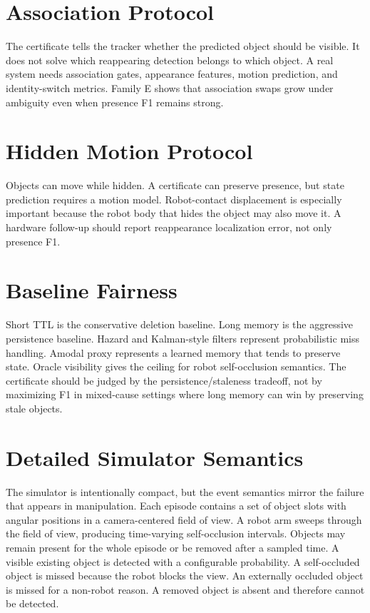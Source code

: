 \documentclass{article}
\begin{document}
\section{Association Protocol}

The certificate tells the tracker whether the predicted object should be
visible. It does not solve which reappearing detection belongs to which object.
A real system needs association gates, appearance features, motion prediction,
and identity-switch metrics. Family E shows that association swaps grow under
ambiguity even when presence F1 remains strong.

\section{Hidden Motion Protocol}

Objects can move while hidden. A certificate can preserve presence, but state
prediction requires a motion model. Robot-contact displacement is especially
important because the robot body that hides the object may also move it. A
hardware follow-up should report reappearance localization error, not only
presence F1.

\section{Baseline Fairness}

Short TTL is the conservative deletion baseline. Long memory is the aggressive
persistence baseline. Hazard and Kalman-style filters represent probabilistic
miss handling. Amodal proxy represents a learned memory that tends to preserve
state. Oracle visibility gives the ceiling for robot self-occlusion semantics.
The certificate should be judged by the persistence/staleness tradeoff, not by
maximizing F1 in mixed-cause settings where long memory can win by preserving
stale objects.

\section{Detailed Simulator Semantics}

The simulator is intentionally compact, but the event semantics mirror the
failure that appears in manipulation. Each episode contains a set of object
slots with angular positions in a camera-centered field of view. A robot arm
sweeps through the field of view, producing time-varying self-occlusion
intervals. Objects may remain present for the whole episode or be removed after
a sampled time. A visible existing object is detected with a configurable
probability. A self-occluded object is missed because the robot blocks the view.
An externally occluded object is missed for a non-robot reason. A removed object
is absent and therefore cannot be detected.
\end{document}
